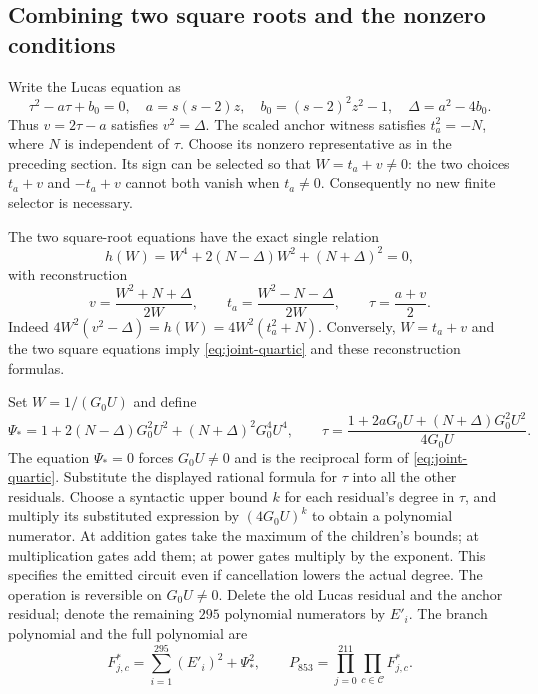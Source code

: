 \subsection{Combining two square roots and the nonzero conditions}

Write the Lucas equation as
\[
 \tau^2-a\tau+b_0=0,\quad
 a=s(s-2)z,\quad b_0=(s-2)^2z^2-1,\quad
 \Delta=a^2-4b_0.
\]
Thus $v=2\tau-a$ satisfies $v^2=\Delta$. The scaled anchor witness
satisfies $t_a^2=-N$, where $N$ is independent of $\tau$.
Choose its nonzero representative as in the preceding section.
Its sign can be selected so that $W=t_a+v\ne0$: the two choices
$t_a+v$ and $-t_a+v$ cannot both vanish when $t_a\ne0$.
Consequently no new finite selector is necessary.

The two square-root equations have the exact single relation
\begin{equation}\label{eq:joint-quartic}
 h(W)=W^4+2(N-\Delta)W^2+(N+\Delta)^2=0,
\end{equation}
with reconstruction
\[
 v=\frac{W^2+N+\Delta}{2W},\qquad
 t_a=\frac{W^2-N-\Delta}{2W},\qquad
 \tau=\frac{a+v}{2}.
\]
Indeed $4W^2(v^2-\Delta)=h(W)=4W^2(t_a^2+N)$.
Conversely, $W=t_a+v$ and the two square equations imply
\eqref{eq:joint-quartic} and these reconstruction formulas.

Set $W=1/(G_0U)$ and define
\[
 \Psi_*=1+2(N-\Delta)G_0^2U^2+(N+\Delta)^2G_0^4U^4,
 \qquad
 \tau=\frac{1+2aG_0U+(N+\Delta)G_0^2U^2}{4G_0U}.
\]
The equation $\Psi_*=0$ forces $G_0U\ne0$ and is the reciprocal
form of \eqref{eq:joint-quartic}. Substitute the displayed rational
formula for $\tau$ into all the other residuals. Choose a syntactic
upper bound $k$ for each residual's degree in $\tau$, and multiply
its substituted expression by $(4G_0U)^k$ to obtain a polynomial
numerator. At addition gates take the maximum of the children's
bounds; at multiplication gates add them; at power gates multiply
by the exponent. This specifies the emitted circuit even if
cancellation lowers the actual degree. The operation is reversible
on $G_0U\ne0$.
Delete the old Lucas residual and the anchor residual; denote the
remaining $295$ polynomial numerators by $E'_i$. The branch polynomial
and the full polynomial are
\[
 F^*_{j,c}=\sum_{i=1}^{295}(E'_i)^2+\Psi_*^2,
 \qquad
 P_{853}=\prod_{j=0}^{211}\prod_{c\in\mathcal C}F^*_{j,c}.
\]

